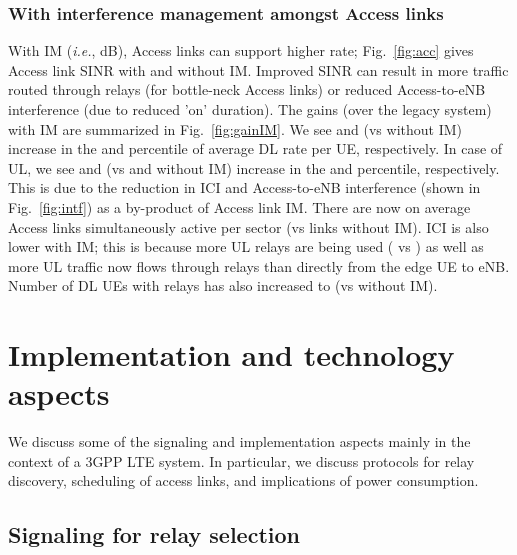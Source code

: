 \documentclass[journal]{IEEEtran}
\newcommand{\ie}{\emph{i.e.}}
\begin{document}
\subsubsection{With interference management amongst Access links}
With IM (\ie, dB), Access links can support higher rate; Fig.~\ref{fig:acc} gives Access link SINR with and without IM.  Improved SINR can result in more traffic routed through relays (for bottle-neck Access links) or reduced Access-to-eNB interference (due to reduced 'on' duration).  The gains (over the legacy system) with IM are summarized in Fig.~\ref{fig:gainIM}.  We see  and  (vs  without IM) increase in the  and  percentile of average DL rate per UE, respectively.  In case of UL, we see  and  (vs  and  without IM) increase in the  and  percentile, respectively.  This is due to the reduction in ICI and Access-to-eNB interference (shown in Fig.~\ref{fig:intf}) as a by-product of Access link IM.  There are now on average  Access links simultaneously active per sector (vs  links without IM).  ICI is also lower with IM; this is because more UL relays are being used ( vs ) as well as more UL traffic now flows through relays than directly from the edge UE to eNB.  Number of DL UEs with relays has also increased to  (vs  without IM).



\section{Implementation and technology aspects}
\label{sec:implementation}

We discuss some of the signaling and implementation aspects mainly in the context of a 3GPP LTE system. In particular, we discuss protocols for relay discovery, scheduling of access links, and implications of power consumption.

\subsection{Signaling for relay selection}
\end{document}
